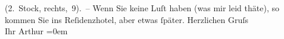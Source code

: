 \begin{ledgroupsized}[t]{13cm}
               (2. Stock,  rechts, 9). – Wenn Sie keine {\pb}Luſt haben (was mir leid thäte), so kommen Sie ins Reſidenzhotel, aber etwas ſpäter.\pend
           \pstart
           Herzlichen Gruſs{\\[\baselineskip]}Ihr \spacefill\mbox{Arthur}\pend
           \leftskip=0em{}
         
         \endnumbering{}\end{ledgroupsized}  \newcommand{\dateiname}{L00797}\newcommand{\titel}{Arthur Schnitzler an Hugo von Hofmannsthal, [29. 5. 1898?]}\newcommand{\editorInnen}{Martin Anton Müller und Gerd-Hermann Susen}
      